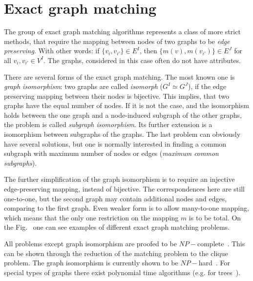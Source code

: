 \section{Exact graph matching}
The group of exact graph matching algorithms represents a class of more strict methods, that require the mapping between nodes of two graphs to be \emph{edge preserving}. With other words: if $\{v_i,v_{i'}\}\in E^I$, then $\{m(v),m(v_{i'})\}\in E^J$ for all $v_i,v_{i'}\in V^I$. The graphs, considered in this case often do not have attributes.

There are several forms of the exact graph matching. The most known one is \emph{graph isomorphism}: two graphs are called \emph{isomorph} ($G^I\simeq G^J$), if the edge preserving mapping between their nodes is bijective. This implies, that two graphs have the equal number of nodes. If it is not the case, and the isomorphism holds between the one graph and a node-induced subgraph of the other graphs, the problem is called \emph{subgraph isomorphism}. Its further extension is a isomorphism between subgraphs of the graphs. The last problem can obviously have several solutions, but one is normally interested in finding a common subgraph with maximum number of nodes or edges (\emph{maximum common subgraphs}).  

The further simplification of the graph isomorphism is to require an injective edge-preserving mapping, instead of bijective. The correspondences here are still one-to-one, but the second graph may contain additional nodes and edges, comparing to the first graph.
Even weaker form is to allow many-to-one mapping, which means that the only one restriction on the mapping $m$ is to be total.
On the Fig.~ one can see examples of different exact graph matching problems.

All problems except graph isomorphism are proofed to be $NP-$complete~\cite{Garey_NPComplet}. This can be shown through the reduction of the matching problem to the clique problem. The graph isomorphism is currently shown to be $NP-$hard~\cite{Garey_NPComplet,Schoening_GI}. For special types of graphs there exist polynomial time algorithms (e.g. for %
trees~\cite{Aho_Ullman, Garey_NPComplet}).

